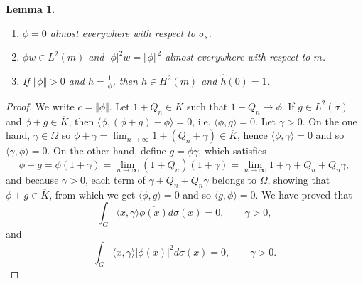 \documentclass{article}
\newcommand{\inner}[2]{\langle #1, #2 \rangle}
\newcommand{\norm}[1]{\Vert #1 \Vert}
\newtheorem{lemma}[theorem]{Lemma}
\begin{document}
\begin{lemma}
\begin{enumerate}
\item $\phi=0$ almost everywhere with respect to $\sigma_s$.
\item $\phi w \in L^2(m)$ and $|\phi|^2 w = \norm{\phi}^2$ almost everywhere with respect to $m$.
\item If $\norm{\phi}>0$ and $h=\frac{1}{\phi}$, then $h \in H^2(m)$ and $\hat{h}(0)=1$.
\end{enumerate}
\label{822}
\end{lemma}
\begin{proof}
We write $c=\norm{\phi}$.
Let $1+Q_n \in K$ such that $1+Q_n \to \phi$. 
If  $g \in L^2(\sigma)$ and $\phi+ g \in \overline{K}$,
then $\inner{\phi}{(\phi+ g) - \phi}=0$, i.e. $\inner{\phi}{g}=0$.
Let $\gamma>0$. On the one hand, $\gamma \in \Omega$ so 
$\phi+\gamma = \lim_{n \to \infty} 1+(Q_n + \gamma) \in \overline{K}$, hence
$\inner{\phi}{\gamma}=0$ and so $\inner{\gamma}{\phi}=0$. On the other hand, define $g=\phi \gamma$, 
which satisfies
\[
\phi+g = \phi(1+\gamma) = \lim_{n \to \infty} (1+Q_n)(1+\gamma)=
\lim_{n \to \infty} 1+\gamma+Q_n+Q_n \gamma,
\]
and because $\gamma >0$, each term of $\gamma+Q_n + Q_n\gamma $ belongs to $\Omega$,
showing that $\phi+g \in \overline{K}$, from which we get $\inner{\phi}{g}=0$ and so $\inner{g}{\phi}=0$. We have proved that
\begin{equation}
\int_G \inner{x}{\gamma} \overline{\phi(x)}  d\sigma(x)=0, \qquad \gamma>0,
\label{phi}
\end{equation}
and
\begin{equation}
\int_G  \inner{x}{\gamma} |\phi(x)|^2  d\sigma(x)=0, \qquad \gamma>0.
\label{phisquared}
\end{equation}


\end{proof}
\end{document}

